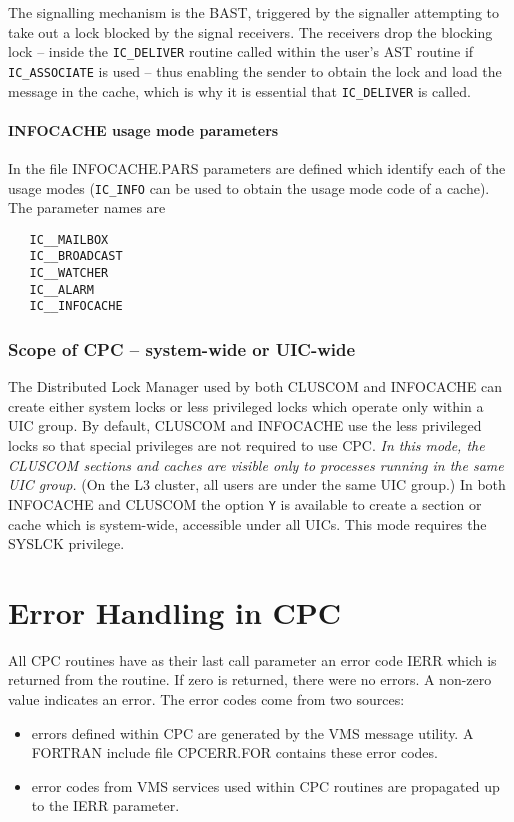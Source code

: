 The signalling mechanism is the BAST, triggered by the signaller
attempting to take out a lock blocked by the signal receivers. The
receivers drop the blocking lock -- inside the \verb|IC_DELIVER| routine
called within the user's AST routine if \verb|IC_ASSOCIATE| is used --
thus enabling the sender to obtain the lock and load the message in
the cache, which is why it is essential that \verb|IC_DELIVER| is called.

\subsection{INFOCACHE usage mode parameters}

In the file INFOCACHE.PARS parameters are defined which identify each
of the \info usage modes (\verb|IC_INFO| can be used to obtain the usage
mode code of a cache). The parameter names are
\begin{verbatim}
   IC__MAILBOX
   IC__BROADCAST
   IC__WATCHER
   IC__ALARM
   IC__INFOCACHE
\end{verbatim}

\section{Scope of CPC -- system-wide or UIC-wide}

The Distributed Lock Manager used by both CLUSCOM and INFOCACHE can
create either system locks or less privileged locks which operate
only within a UIC group. By default, CLUSCOM and INFOCACHE use the
less privileged locks so that special privileges are not required
to use CPC. {\em In this mode, the CLUSCOM sections and caches are
visible only to processes running in the same UIC group.} (On the
L3 cluster, all users are under the same UIC group.) In both 
INFOCACHE and CLUSCOM the option {\tt Y} is available to create a
section or cache which is system-wide, accessible under all UICs. This
mode requires the SYSLCK privilege.



\newpage
\part{Error Handling in CPC}

All CPC routines have as their last call parameter an error code IERR
which is returned from the routine. If zero is returned, there were
no errors. A non-zero value indicates an error. The error codes come
from two sources:
\begin{itemize}
  \item errors defined within CPC are generated by the VMS message
  utility. A FORTRAN include file CPCERR.FOR contains these error
  codes.
  \item error codes from VMS services used within CPC routines are
  propagated up to the IERR parameter.

\end{itemize}

